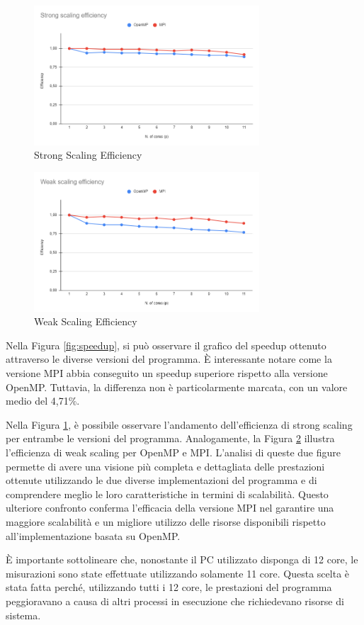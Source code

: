 \documentclass[a4paper,12pt, oneside]{article}
\begin{document}
\begin{figure}[h]
    \centering
    \includegraphics[width=0.75\textwidth]{strong-scaling.png}
    \caption{Strong Scaling Efficiency}
    \label{fig:strong-scaling}
\end{figure}

\begin{figure}[h]
    \centering
    \includegraphics[width=0.75\textwidth]{weak-scaling.png}
    \caption{Weak Scaling Efficiency}
    \label{fig:weak-scaling}
\end{figure}

Nella Figura \ref{fig:speedup}, si può osservare il grafico del speedup ottenuto attraverso
le diverse versioni del programma. È interessante notare come la versione MPI abbia
conseguito un speedup superiore rispetto alla versione OpenMP. Tuttavia, la differenza non
è particolarmente marcata, con un valore medio del 4,71\%.

Nella Figura \ref{fig:strong-scaling}, è possibile osservare l'andamento dell'efficienza di
strong scaling per entrambe le versioni del programma. Analogamente, la Figura \ref{fig:weak-scaling}
illustra l'efficienza di weak scaling per OpenMP e MPI. L'analisi di queste due figure
permette di avere una visione più completa e dettagliata delle prestazioni ottenute
utilizzando le due diverse implementazioni del programma e di comprendere meglio le loro
caratteristiche in termini di scalabilità. Questo ulteriore confronto conferma l'efficacia
della versione MPI nel garantire una maggiore scalabilità e un migliore utilizzo delle
risorse disponibili rispetto all'implementazione basata su OpenMP.

È importante sottolineare che, nonostante il PC utilizzato disponga di 12 core, le
misurazioni sono state effettuate utilizzando solamente 11 core. Questa scelta è stata
fatta perché, utilizzando tutti i 12 core, le prestazioni del programma peggioravano a
causa di altri processi in esecuzione che richiedevano risorse di sistema.
\end{document}
